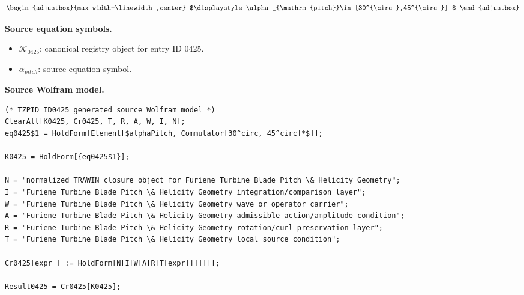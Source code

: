 \[
\begin{adjustbox}{max width=\linewidth,center}
$\displaystyle
\alpha_{\mathrm{pitch}}\in[30^{\circ},45^{\circ}]
$
\end{adjustbox}
\]

\begin{minipage}[t]{0.49\linewidth}
\begingroup
\small
\raggedright
\textbf{Source equation symbols.}\par
\begin{itemize}[leftmargin=1.35em,itemsep=1pt,topsep=1pt,parsep=0pt]
    \item $\mathcal{K}_{0425}$: canonical registry object for entry ID 0425.
    \item $\alpha_{pitch}$: source equation symbol.
\end{itemize}
\endgroup
\end{minipage}\hfill
\begin{minipage}[t]{0.47\linewidth}
\begingroup
\scriptsize
\raggedright
\textbf{Source Wolfram model.}\par
\begin{Verbatim}[fontsize=\tiny,breaklines=true,breakanywhere=true]
(* TZPID ID0425 generated source Wolfram model *)
ClearAll[K0425, Cr0425, T, R, A, W, I, N];
eq0425$1 = HoldForm[Element[$alphaPitch, Commutator[30^circ, 45^circ]*$]];

K0425 = HoldForm[{eq0425$1}];

N = "normalized TRAWIN closure object for Furiene Turbine Blade Pitch \& Helicity Geometry";
I = "Furiene Turbine Blade Pitch \& Helicity Geometry integration/comparison layer";
W = "Furiene Turbine Blade Pitch \& Helicity Geometry wave or operator carrier";
A = "Furiene Turbine Blade Pitch \& Helicity Geometry admissible action/amplitude condition";
R = "Furiene Turbine Blade Pitch \& Helicity Geometry rotation/curl preservation layer";
T = "Furiene Turbine Blade Pitch \& Helicity Geometry local source condition";

Cr0425[expr_] := HoldForm[N[I[W[A[R[T[expr]]]]]]];

Result0425 = Cr0425[K0425];
\end{Verbatim}
\endgroup
\end{minipage}

